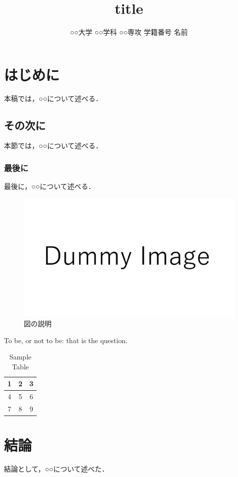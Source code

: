 \documentclass{classes/resume}
\title{
	title
}
\author{
	○○大学 ○○学科 ○○専攻 学籍番号 名前
}
\begin{document}
\maketitle

\section{はじめに}
本稿では，○○について述べる．
\subsection{その次に}
本節では，○○について述べる．
\subsubsection{最後に}
最後に，○○について述べる．

\begin{figure}[htbp]
    \centering
    \includegraphics[width=\linewidth]{figures/dummy.pdf}
    \caption{図の説明 \cite{ref:nomura2022uwb} \cite{ref:青空文庫Aozo22:online}}
    \label{fig:fig1}
\end{figure}


To be, or not to be: that is the question.


\begin{table}[h]
    \centering
    \begin{tabular}{|c|c|c|}
        \hline
        1 & 2 & 3 \\
        \hline
        4 & 5 & 6 \\
        \hline
        7 & 8 & 9 \\
        \hline
    \end{tabular}
    \caption{Sample Table}
    \label{tab:sample}
\end{table}

\section{結論}
結論として，○○について述べた．


\end{document}
